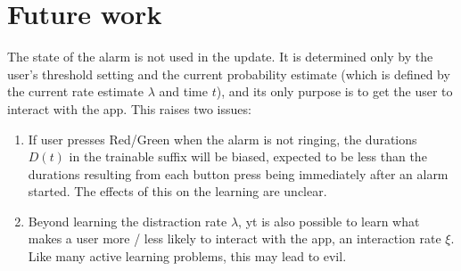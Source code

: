 \documentclass{article}
\begin{document}
\section{Future work}
The state of the alarm is not used in the update.  It is determined only by the user's threshold setting and the current probability estimate (which is defined by the current rate estimate $\lambda$ and time $t$), and its only purpose is to get the user to interact with the app.  This raises two issues:
\begin{enumerate}
\item If user presses Red/Green when the alarm is not ringing, the durations $D(t)$ in the trainable suffix will be biased, expected to be less than the durations resulting from each button press being immediately after an alarm started.  The effects of this on the learning are unclear.


\item Beyond learning the distraction rate $\lambda$, yt is also possible to learn what makes a user more / less likely to interact with the app, an interaction rate $\xi$.  Like many active learning problems, this may lead to evil.
\end{enumerate}
\end{document}
